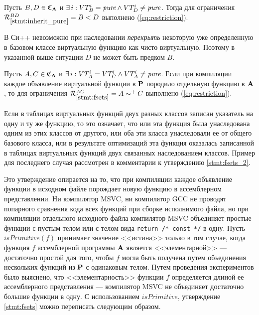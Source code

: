 \begin{statement}\label{stmt:inherit_pure}
Пусть $B, D \in \mathfrak{C}_{\mathbf{A}}$ и $\exists \, i: VT_B^i = \textit{pure} \wedge VT_D^i \ne \textit{pure}$. Тогда для ограничения $\mathcal{R}_{\ref{stmt:inherit_pure}}^{BD} = B < D$ выполнено (\ref{eq:restriction}).
\end{statement}
В Си++ невозможно при наследовании {\it перекрыть} некоторую уже определенную в базовом классе виртуальную функцию как чисто виртуальную. Поэтому в указанной выше ситуации $D$ не может быть предком $B$.

\begin{statement}\label{stmt:fsets}
Пусть $A, C \in \mathfrak{C}_{\mathbf{A}}$ и $\exists \, i: VT_A^i = VT_C^i \wedge VT_A^i \ne \textit{pure}$. Если при компиляции каждое объявление виртуальной функции в $\mathbf{P}$ породило отдельную функцию в $\mathbf{A}$, то для ограничения $\mathcal{R}_{\ref{stmt:fsets}}^{AC} = A \sim^+ C$ выполнено (\ref{eq:restriction}).
\end{statement}
Если в таблицах виртуальных функций двух разных классов записан указатель на одну и ту же функцию, то это означает, что или эта функция была унаследована одним из этих классов от другого, или оба эти класса унаследовали ее от общего базового класса, или в результате оптимизаций эта функция оказалась записанной в таблицах виртуальных функций двух связанных наследованием классов. Пример для последнего случая рассмотрен в комментарии к утверждению \ref{stmt:fsets_2}.


Это утверждение опирается на то, что при компиляции каждое объявление функции в исходном файле порождает новую функцию в ассемблерном представлении. Ни компилятор MSVC, ни компилятор GCC не проводят попарного сравнения кода всех функций при сборке исполнимого файла, но при компиляции отдельного исходного файла компилятор MSVC объединяет простые функции с пустым телом или с телом вида \lstinline{return /* const */} в одну. Пусть $\textit{isPrimitive}(f)$ принимает значение <<истина>> только в том случае, когда функция $f$ ассемблерной программы $\mathbf{A}$ является <<элементарной>> --- достаточно простой для того, чтобы $f$ могла быть получена путем объединения нескольких функций из $\mathbf{P}$ с одинаковым телом. Путем проведения экспериментов было выяснено, что <<элементарность>> функции $f$ определяется длиной ее ассемблерного представления --- компилятор MSVC не объединяет достаточно большие функции в одну. С использованием $\textit{isPrimitive}$, утверждение \ref{stmt:fsets} можно переписать следующим образом.

